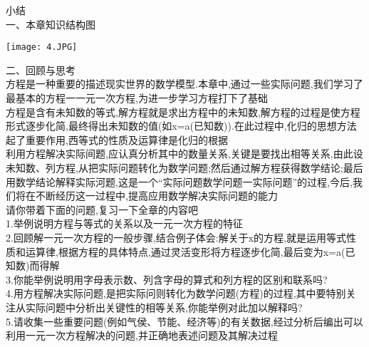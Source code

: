 \documentclass[11pt,apaper]{article}
\begin{document}
\begin{framed}
小结\\
一、本章知识结构图\\
\begin{center}
  \texttt{[image: 4.JPG]}\\
\end{center}
二、回顾与思考\\
方程是一种重要的描述现实世界的数学模型.本章中,通过一些实际问题,我们学习了最基本的方程一一元一次方程,为进一步学习方程打下了基础\\
方程是含有未知数的等式,解方程就是求出方程中的未知数,解方程的过程是使方程形式逐步化简,最终得出未知数的值(如x=a(已知数)).在此过程中,化归的思想方法起了重要作用,西等式的性质及运算律是化归的根据\\
利用方程解决实际间题,应认真分析其中的数量关系,关键是要找出相等关系,由此设未知数、列方程,从把实际问题转化为数学问题;然后通过解方程获得数学结论;最后用数学结论解释实际河题,这是一个“实际问题数学问题一实际问题”的过程,今后,我们将在不断经历这一过程中,提高应用数学解决实际问题的能力\\
请你带着下面的问题,复习一下全章的内容吧\\
1.举例说明方程与等式的关系以及一元一次方程的特征\\
2.回顾解一元一次方程的一般步骤,结合例子体会:解关于x的方程,就是运用等式性质和运算律,根据方程的具体特点,通过灵活变形将方程逐步化简,最后变为x=a(已知数)而得解\\
3.你能举例说明用字母表示数、列含字母的算式和列方程的区别和联系吗?\\
4.用方程解决实际问题,是把实际问则转化为数学问题(方程)的过程,其中要特别关注从实际问题中分析出关键性的相等关系,你能举例对此加以解释吗?\\
5.请收集一些重要问题(例如气侯、节能、经济等)的有关数据,经过分析后编出可以利用一元一次方程解决的问题,并正确地表述问题及其解决过程\\

\end{framed}
\end{document}
